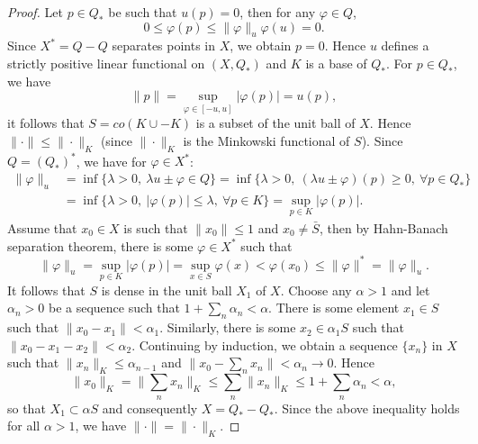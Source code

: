 \documentclass[12pt]{article}
\theoremstyle{remark}
\newcommand{\<}{\langle}
\begin{document}
\begin{proof}
Let $p\in Q_*$ be such that $u(p)=0$, then for any $\varphi\in Q$, 
\[
0\le \varphi(p)\le \|\varphi\|_u\varphi(u)=0.
\]
Since  $X^*=Q-Q$ separates points in $X$, we obtain $p=0$. Hence 
$u$ defines a strictly positive linear functional on $(X,Q_*)$  and $K$ is a base of $Q_*$. 
For $p\in Q_*$, we have
\[
\|p\|=\sup_{\varphi\in [-u,u]}|\varphi(p)|=u(p),
\]
it follows that $S=co(K\cup -K)$ is a subset of the unit ball of $X$. Hence $\|\cdot\|\le \|\cdot\|_K$ (since $\|\cdot\|_K$ is the Minkowski functional of $S$).   Since $Q=(Q_*)^*$, we have for $\varphi\in X^*$:
\begin{align*}
\|\varphi\|_u&=\inf\{\lambda >0,\ \lambda u\pm \varphi\in Q\}=\inf\{\lambda >0,\ (\lambda u\pm \varphi)(p)\ge 0,\ \forall p \in Q_*\}\\
&= \inf\{\lambda>0,\ |\varphi(p)|\le \lambda,\ \forall p\in K\}=\sup_{p\in K}|\varphi(p)|.
\end{align*}
Assume that $x_0\in X$ is such that $\|x_0\|\le 1$ and $x_0\ne \bar S$, then by Hahn-Banach separation theorem, there is some $\varphi\in X^*$ such that 
\[
\|\varphi\|_u=\sup_{p\in K}|\varphi(p)|=\sup_{x\in S}\varphi(x)< \varphi(x_0)\le \|\varphi\|^*=\|\varphi\|_u.
\]
It follows that $S$ is dense in the unit ball $X_1$ of $X$.  Choose any $\alpha>1$ and let $\alpha_n>0$ be a sequence such that  $1+\sum_n\alpha_n<\alpha$. There is some element $x_1\in S$ such that $\|x_0-x_1\|< \alpha_1$. Similarly, there is some $x_2\in \alpha_1S$ 
such that $\|x_0-x_1-x_2\|<\alpha_2$. Continuing by induction, we obtain a sequence $\{x_n\}$ in $X$ such that $\|x_n\|_K\le \alpha_{n-1}$ and  $\|x_0-\sum_n x_n\|<\alpha_n\to 0$. Hence  
\[
\|x_0\|_K=\|\sum_n x_n\|_K\le \sum_n\|x_n\|_K\le 1+\sum_n\alpha_n<\alpha,
\]
so that  $X_1\subset \alpha S$ and consequently $X=Q_*-Q_*$. Since the above inequality holds for all $\alpha>1$, we have
$\|\cdot\|=\|\cdot\|_K$.



%




\end{proof}
\end{document}
